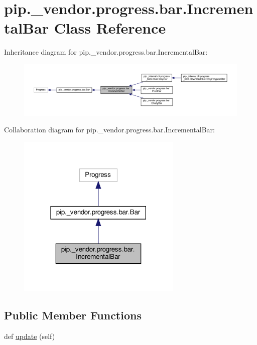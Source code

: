 \hypertarget{classpip_1_1__vendor_1_1progress_1_1bar_1_1IncrementalBar}{}\section{pip.\+\_\+vendor.\+progress.\+bar.\+Incremental\+Bar Class Reference}
\label{classpip_1_1__vendor_1_1progress_1_1bar_1_1IncrementalBar}


Inheritance diagram for pip.\+\_\+vendor.\+progress.\+bar.\+Incremental\+Bar\+:
\nopagebreak
\begin{figure}[H]
\begin{center}
\leavevmode
\includegraphics[width=350pt]{classpip_1_1__vendor_1_1progress_1_1bar_1_1IncrementalBar__inherit__graph}
\end{center}
\end{figure}


Collaboration diagram for pip.\+\_\+vendor.\+progress.\+bar.\+Incremental\+Bar\+:
\nopagebreak
\begin{figure}[H]
\begin{center}
\leavevmode
\includegraphics[width=222pt]{classpip_1_1__vendor_1_1progress_1_1bar_1_1IncrementalBar__coll__graph}
\end{center}
\end{figure}
\subsection*{Public Member Functions}
\begin{DoxyCompactItemize}
\item 
def \hyperlink{classpip_1_1__vendor_1_1progress_1_1bar_1_1IncrementalBar_a6e0eb6d866a1f8904d51d3d2a7e60bf0}{update} (self)
\end{DoxyCompactItemize}
